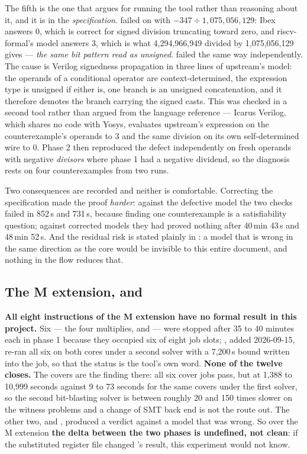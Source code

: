 The fifth is the one that argues for running the tool rather than
reasoning about it, and it is in the \emph{specification}.
 failed on  with
$-347 \div 1{,}075{,}056{,}129$: Ibex answers 0, which is correct for
signed division truncating toward zero, and riscv-formal's model answers
3, which is what 4,294,966,949 divided by 1,075,056,129 gives ---
\emph{the same bit pattern read as unsigned}. 
failed the same way independently. The cause is Verilog signedness
propagation in three lines of upstream's model: the operands of a
conditional operator are context-determined, the expression type is
unsigned if either is, one branch is an unsigned concatenation, and it
therefore demotes the branch carrying the signed casts. This was checked
in a second tool rather than argued from the language reference --- Icarus
Verilog, which shares no code with Yosys, evaluates upstream's expression
on the counterexample's operands to 3 and the same division on its own
self-determined wire to 0. Phase 2 then reproduced the defect
independently on fresh operands with negative \emph{divisors} where phase
1 had a negative dividend, so the diagnosis rests on four counterexamples
from two runs.

Two consequences are recorded and neither is comfortable. Correcting the
specification made the proof \emph{harder}: against the defective model
the two checks failed in 852\,s and 731\,s, because finding one
counterexample is a satisfiability question; against corrected models
they had proved nothing after 40\,min 43\,s and 48\,min 52\,s. And the
residual risk is stated plainly in : a model that is
wrong in the same direction as the core would be invisible to this entire
document, and nothing in the flow reduces that.

\subsection{The M extension, and }

\textbf{All eight instructions of the M extension have no formal result
in this project.} Six --- the four multiplies,  and
 --- were stopped after 35 to 40 minutes each in phase 1
because they occupied six of eight job slots; ,
added 2026-09-15, re-ran all six on both cores under a second solver with
a 7,200\,s bound written into the job, so that the status is the tool's
own word. \textbf{None of the twelve closes.} The covers are the finding
there: all six cover jobs pass, but at 1,388 to 10,999 seconds against 9
to 73 seconds for the same covers under the first solver, so the second
bit-blasting solver is between roughly 20 and 150 times slower on the
witness problems and a change of SMT back end is not the route out. The
other two,  and , produced a verdict against a model
that was wrong. So over the M extension \textbf{the delta between the two
phases is undefined, not clean}: if the substituted register file changed
's result, this experiment would not know.

